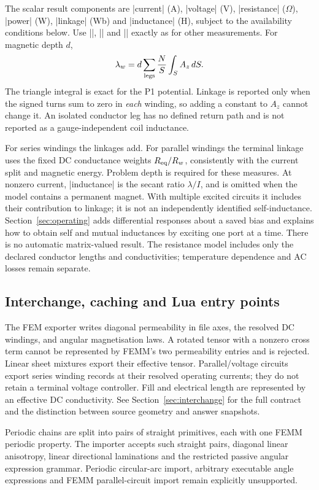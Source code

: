 The scalar result components are |current| (A), |voltage| (V), |resistance|
($\Omega$), |power| (W), |linkage| (Wb) and |inductance| (H), subject to the
availability conditions below. Use |\femmresult|, |\femmvalue| and
|\femmresultplot| exactly as for other measurements. For magnetic depth $d$,
\[
 \lambda_w=d\sum_{\rm legs}\frac{N}{S}\int_S A_z\,dS.
\]
The triangle integral is exact for the P1 potential. Linkage is reported only
when the signed turns sum to zero in \emph{each} winding, so adding a constant
to $A_z$ cannot change it. An isolated conductor leg has no defined return path
and is not reported as a gauge-independent coil inductance.

For series windings the linkages add. For parallel windings the terminal linkage
uses the fixed DC conductance weights $R_{\rm eq}/R_w$, consistently with the
current split and magnetic energy. Problem depth is required for these measures.
At nonzero current, |inductance| is the secant ratio $\lambda/I$, and is omitted
when the model contains a permanent magnet. With multiple excited circuits it
includes their contribution to linkage; it is not an independently identified
self-inductance. Section~\ref{sec:operating} adds differential responses about a
saved bias and explains how to obtain self and mutual inductances by exciting
one port at a time. There is no automatic matrix-valued result. The resistance model includes only the declared conductor
lengths and conductivities; temperature dependence and AC losses remain separate.

\subsection{Interchange, caching and Lua entry points}
The FEM exporter writes diagonal permeability in file axes, the resolved DC
windings, and angular magnetisation laws. A rotated tensor with a nonzero cross
term cannot be represented by FEMM's two permeability entries and is rejected.
Linear sheet mixtures export their effective tensor. Parallel/voltage circuits
export series winding records at their resolved operating currents; they do not
retain a terminal voltage controller. Fill and electrical length are represented
by an effective DC conductivity. See Section~\ref{sec:interchange} for the full
contract and the distinction between source geometry and answer snapshots.

Periodic chains are split into pairs of straight primitives, each with one FEMM
periodic property. The importer accepts such straight pairs, diagonal linear
anisotropy, linear directional laminations and the restricted passive angular
expression grammar. Periodic circular-arc import, arbitrary executable angle
expressions and FEMM parallel-circuit import remain explicitly unsupported.

